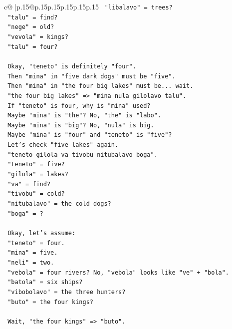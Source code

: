 \documentclass{article}
\begin{document}
{\begin{supertabular}{c@{$\;$}|p{.15\linewidth}@{}p{.15\linewidth}p{.15\linewidth}p{.15\linewidth}p{.15\linewidth}p{.15\linewidth}}
{{{\texttt{   "libalavo" = trees?} \\
\texttt{   "talu" = find?} \\
\texttt{   "nege" = old?} \\
\texttt{   "vevola" = kings?} \\
\texttt{   "talu" = four?} \\
\\ 
\texttt{   Okay, "teneto" is definitely "four".} \\
\texttt{   Then "mina" in "five dark dogs" must be "five".} \\
\texttt{   Then "mina" in "the four big lakes" must be... wait.} \\
\texttt{   "the four big lakes" => "mina nula gilolavo talu".} \\
\texttt{   If "teneto" is four, why is "mina" used?} \\
\texttt{   Maybe "mina" is "the"? No, "the" is "labo".} \\
\texttt{   Maybe "mina" is "big"? No, "nula" is big.} \\
\texttt{   Maybe "mina" is "four" and "teneto" is "five"?} \\
\texttt{   Let's check "five lakes" again.} \\
\texttt{   "teneto gilola va tivobu nitubalavo boga".} \\
\texttt{   "teneto" = five?} \\
\texttt{   "gilola" = lakes?} \\
\texttt{   "va" = find?} \\
\texttt{   "tivobu" = cold?} \\
\texttt{   "nitubalavo" = the cold dogs?} \\
\texttt{   "boga" = ?} \\
\\ 
\texttt{   Okay, let's assume:} \\
\texttt{   "teneto" = four.} \\
\texttt{   "mina" = five.} \\
\texttt{   "neli" = two.} \\
\texttt{   "vebola" = four rivers? No, "vebola" looks like "ve" + "bola".} \\
\texttt{   "batola" = six ships?} \\
\texttt{   "vibobolavo" = the three hunters?} \\
\texttt{   "buto" = the four kings?} \\
\\ 
\texttt{   Wait, "the four kings" => "buto".} \\
}}}
\end{supertabular}}
\end{document}
